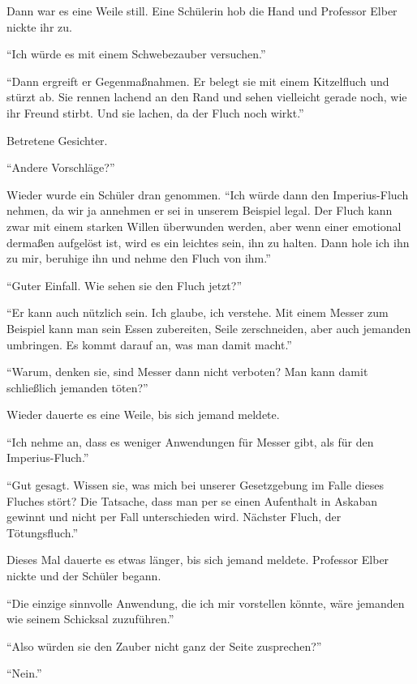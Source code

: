 Dann war es eine Weile still. Eine Schülerin hob die Hand und Professor Elber nickte ihr zu.

\enquote{Ich würde es mit einem Schwebezauber versuchen.}

\enquote{Dann ergreift er Gegenmaßnahmen. Er belegt sie mit einem Kitzelfluch und stürzt ab. Sie rennen lachend an den Rand und sehen vielleicht gerade noch, wie ihr Freund stirbt. Und sie lachen, da der Fluch noch wirkt.}

Betretene Gesichter.

\enquote{Andere Vorschläge?}

Wieder wurde ein Schüler dran genommen. \enquote{Ich würde dann den Imperius-Fluch nehmen, da wir ja annehmen er sei in unserem Beispiel legal. Der Fluch kann zwar mit einem starken Willen überwunden werden, aber wenn einer emotional dermaßen aufgelöst ist, wird es ein leichtes sein, ihn zu halten. Dann hole ich ihn zu mir, beruhige ihn und nehme den Fluch von ihm.}

\enquote{Guter Einfall. Wie sehen sie den Fluch jetzt?}

\enquote{Er kann auch nützlich sein. \gst Ich glaube, ich verstehe. Mit einem Messer zum Beispiel kann man sein Essen zubereiten, Seile zerschneiden, aber auch jemanden umbringen. Es kommt darauf an, was man damit macht.}

\enquote{Warum, denken sie, sind Messer dann nicht verboten? Man kann damit schließlich jemanden töten?}

Wieder dauerte es eine Weile, bis sich jemand meldete.

\enquote{Ich nehme an, dass es weniger  Anwendungen für Messer gibt, als für den Imperius-Fluch.}

\enquote{Gut gesagt. Wissen sie, was mich bei unserer Gesetzgebung im Falle dieses Fluches stört? \gst Die Tatsache, dass man per se einen Aufenthalt in Askaban gewinnt und nicht per Fall unterschieden wird. \gst Nächster Fluch, der Tötungsfluch.}

Dieses Mal dauerte es etwas länger, bis sich jemand meldete. Professor Elber nickte und der Schüler begann.

\enquote{Die einzige sinnvolle Anwendung, die ich mir vorstellen könnte, wäre jemanden wie  seinem Schicksal zuzuführen.}

\enquote{Also würden sie den Zauber nicht ganz der  Seite zusprechen?}

\enquote{Nein.}

